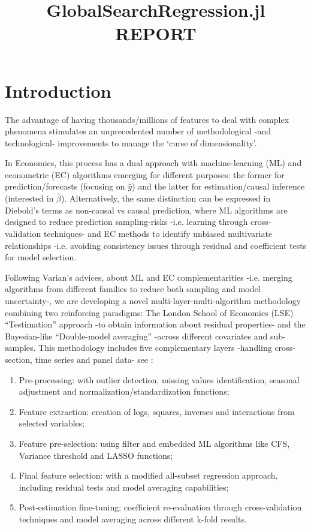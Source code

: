 \documentclass{article}
\title{GlobalSearchRegression.jl \\
       \vspace{5mm} REPORT}
\begin{document}
\maketitle

\vspace{5mm}
\tableofcontents
\clearpage


\section{Introduction}
The advantage of having thousands/millions of features to deal with complex phenomena stimulates an unprecedented number of methodological -and technological- improvements to manage the ‘curse of dimensionality’. 

In Economics, this process has a dual approach with machine-learning (ML) and econometric (EC) algorithms emerging for different purposes: the former for prediction/forecasts (focusing on $\hat{y}$) and the latter for estimation/causal inference (interested in $\hat{\beta}$). Alternatively, the same distinction can be expressed in Diebold’s terms as non-causal vs causal prediction, where ML algorithms are designed to reduce prediction sampling-risks -i.e. learning through cross-validation techniques- and EC methods to identify unbiased multivariate relationships -i.e. avoiding consistency issues through residual and coefficient tests for model selection. 

Following Varian’s advices, about ML and EC complementarities -i.e. merging algorithms from different families to reduce both sampling and model uncertainty-, we are developing a novel multi-layer-multi-algorithm methodology combining two reinforcing paradigms: The London School of Economics (LSE) “Testimation” approach -to obtain information about residual properties- and the Bayesian-like “Double-model averaging” -across different covariates and sub-samples. This methodology includes five complementary layers -handling cross-section, time series and panel data- see \cite{gsreg2019}: \begin{enumerate}
    \item Pre-processing: with outlier detection, missing values identification, seasonal adjustment and normalization/standardization functions; 
    
    \item  Feature extraction: creation of logs, squares, inverses and interactions from selected variables;
    
    \item  Feature pre-selection: using filter and embedded ML algorithms like CFS, Variance threshold and LASSO functions; 
    
    \item Final feature selection: with a modified all-subset regression approach, including residual tests and model averaging capabilities; 
    
    \item Post-estimation fine-tuning: coefficient re-evaluation through cross-validation techniques and model averaging across different k-fold results. 
\end{enumerate}
\end{document}
